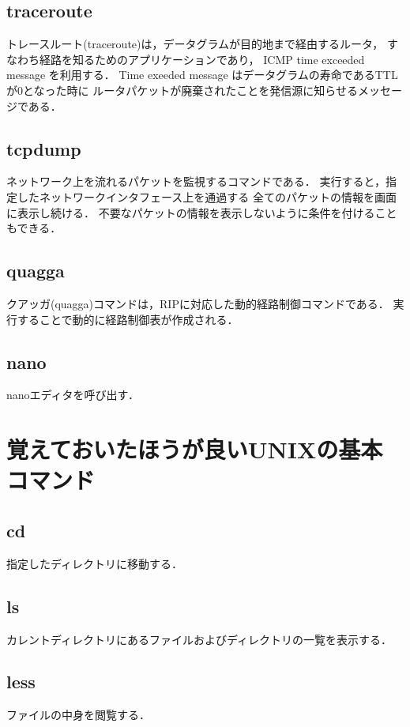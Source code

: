 \documentclass[10pt,a4paper]{jarticle}
\begin{document}
\subsection{traceroute}
トレースルート(traceroute)は，データグラムが目的地まで経由するルータ，
すなわち経路を知るためのアプリケーションであり，
ICMP time exceeded message を利用する．
Time exeeded message はデータグラムの寿命であるTTLが0となった時に
ルータパケットが廃棄されたことを発信源に知らせるメッセージである．

\subsection{tcpdump}
ネットワーク上を流れるパケットを監視するコマンドである．
実行すると，指定したネットワークインタフェース上を通過する
全てのパケットの情報を画面に表示し続ける．
不要なパケットの情報を表示しないように条件を付けることもできる．

\subsection{quagga}
クアッガ(quagga)コマンドは，RIPに対応した動的経路制御コマンドである．
実行することで動的に経路制御表が作成される．

\subsection{nano}
nanoエディタを呼び出す．


\section{覚えておいたほうが良いUNIXの基本コマンド}

\subsection{cd}
指定したディレクトリに移動する．

\subsection{ls}
カレントディレクトリにあるファイルおよびディレクトリの一覧を表示する．

\subsection{less}
ファイルの中身を閲覧する．
\end{document}
